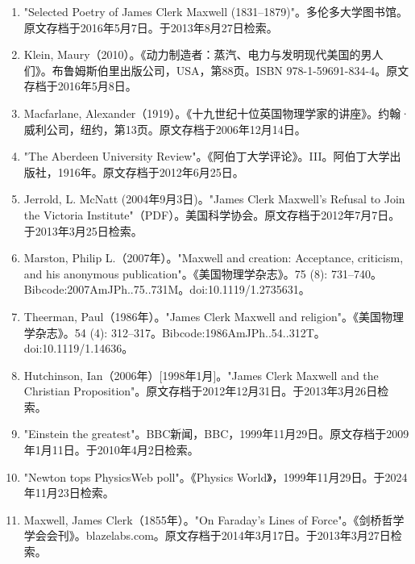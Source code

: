 \begin{enumerate}
\item "Selected Poetry of James Clerk Maxwell (1831–1879)"。多伦多大学图书馆。原文存档于2016年5月7日。于2013年8月27日检索。  
\item Klein, Maury（2010）。《动力制造者：蒸汽、电力与发明现代美国的男人们》。布鲁姆斯伯里出版公司，USA，第88页。ISBN 978-1-59691-834-4。原文存档于2016年5月8日。  
\item Macfarlane, Alexander（1919）。《十九世纪十位英国物理学家的讲座》。约翰·威利公司，纽约，第13页。原文存档于2006年12月14日。  
\item "The Aberdeen University Review"。《阿伯丁大学评论》。III。阿伯丁大学出版社，1916年。原文存档于2012年6月25日。
\item Jerrold, L. McNatt (2004年9月3日)。"James Clerk Maxwell's Refusal to Join the Victoria Institute"（PDF）。美国科学协会。原文存档于2012年7月7日。于2013年3月25日检索。  
\item Marston, Philip L.（2007年）。"Maxwell and creation: Acceptance, criticism, and his anonymous publication"。《美国物理学杂志》。75 (8): 731–740。Bibcode:2007AmJPh..75..731M。doi:10.1119/1.2735631。  
\item Theerman, Paul（1986年）。"James Clerk Maxwell and religion"。《美国物理学杂志》。54 (4): 312–317。Bibcode:1986AmJPh..54..312T。doi:10.1119/1.14636。  
\item Hutchinson, Ian（2006年）[1998年1月]。"James Clerk Maxwell and the Christian Proposition"。原文存档于2012年12月31日。于2013年3月26日检索。  
\item "Einstein the greatest"。BBC新闻，BBC，1999年11月29日。原文存档于2009年1月11日。于2010年4月2日检索。  
\item "Newton tops PhysicsWeb poll"。《Physics World》，1999年11月29日。于2024年11月23日检索。  
\item Maxwell, James Clerk（1855年）。"On Faraday's Lines of Force"。《剑桥哲学学会会刊》。blazelabs.com。原文存档于2014年3月17日。于2013年3月27日检索。
\end{enumerate}